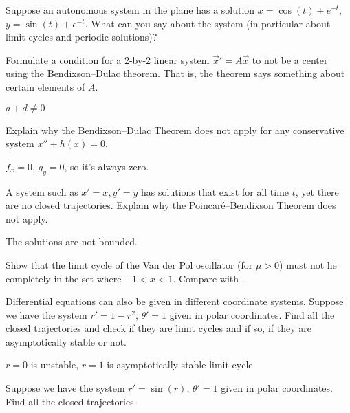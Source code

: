 \begin{exercise}\ansMark%
Suppose an autonomous system in the plane has a solution
$x=\cos(t)+e^{-t}$, $y=\sin(t)+e^{-t}$.  What can you say
about the system (in particular about limit cycles and periodic solutions)?
\end{exercise}

\begin{exercise}
Formulate a condition for a 2-by-2 linear system
${\vec{x}}' = A \vec{x}$ to not be a center using the Bendixson--Dulac theorem.
That is, the theorem says something about certain elements of $A$.
\end{exercise}
\comboSol{%
}
{%
$a+d \neq 0$
}

\begin{exercise}
Explain why the Bendixson--Dulac Theorem does not apply for any conservative
system $x''+h(x) = 0$.
\end{exercise}
\comboSol{%
}
{%
$f_x = 0$, $g_y = 0$, so it's always zero.
}

\begin{exercise}
A system such as $x'=x, y'=y$ has solutions that exist for all time $t$,
yet there are no closed trajectories.  Explain
why the Poincar\'e--Bendixson Theorem does not apply.
\end{exercise}
\comboSol{%
}
{%
The solutions are not bounded.
}

\begin{exercise}\ansMark%
Show that the limit cycle
of the 
Van der Pol oscillator (for $\mu > 0$) must not lie completely in the set
where 
$-1 < x < 1$.
Compare with .
\end{exercise}

\begin{exercise}
Differential equations can also be given in different coordinate systems.  
Suppose we have the system $r' = 1-r^2$, $\theta' = 1$ given
in polar coordinates.  Find all the closed trajectories and check if they
are limit cycles and if so, if they are asymptotically stable or not.
\end{exercise}
\comboSol{%
}
{%
$r=0$ is unstable, $r=1$ is asymptotically stable limit cycle
}

\begin{exercise}\ansMark%
Suppose we have the system $r' = \sin(r)$, $\theta' = 1$ given
in polar coordinates.  Find all the closed trajectories.
\end{exercise}



\setcounter{exercise}{100}

